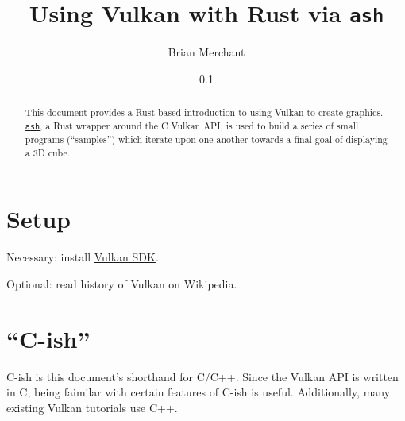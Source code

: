 \documentclass[12pt,letterpaper]{article}
\newcommand{\inquotes}[1]{``#1''}	%
\newcommand{\ash}{\texttt{ash}}
\begin{document}
\title{Using Vulkan with Rust via \ash}
\date{0.1}
\author{Brian Merchant}
\maketitle
\tableofcontents
\reversemarginpar


\begin{abstract}
    This document provides a Rust-based introduction to using Vulkan to create graphics. \href{https://github.com/MaikKlein/ash}{\ash}, a Rust wrapper around the C Vulkan API, is used to build a series of small programs (\inquotes{samples}) which iterate upon one another towards a final goal of displaying a 3D cube.  
\end{abstract}

\section{Setup}
    Necessary: install \href{https://www.lunarg.com/vulkan-sdk/}{Vulkan SDK}.
    
    Optional: read history of Vulkan on Wikipedia.
	
\section{\inquotes{C-ish}}
	C-ish is this document's shorthand for C/C++. Since the Vulkan API is written in C, being faimilar with certain features of C-ish is useful. Additionally, many existing Vulkan tutorials use C++. 
    
\end{document}
